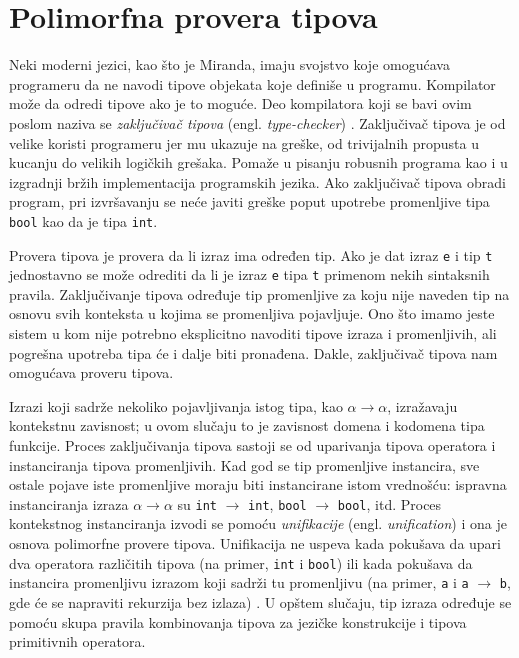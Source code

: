 \section{Polimorfna provera tipova}
\label{sec:provera tipova}

Neki moderni jezici, kao što je Miranda, imaju svojstvo koje omogućava programeru da ne navodi tipove objekata koje definiše u programu. Kompilator može da odredi tipove ako je to moguće. Deo kompilatora koji se bavi ovim poslom naziva se \textit{zaključivač tipova} (engl. \textit{type-checker}) \cite{the-implementation-of-functional-programming-languages}. Zaključivač tipova je od velike koristi programeru jer mu ukazuje na greške, od trivijalnih propusta u kucanju do velikih logičkih grešaka. Pomaže u pisanju robusnih programa kao i u izgradnji bržih implementacija programskih jezika. Ako zaključivač tipova obradi program, pri izvršavanju se neće javiti greške poput upotrebe promenljive tipa \verb|bool| kao da je tipa \verb|int|.



Provera tipova je provera da li izraz ima određen tip. Ako je dat izraz \verb|e| i tip \verb|t| jednostavno se može odrediti da li je izraz \verb|e| tipa \verb|t| primenom nekih sintaksnih pravila. Zaključivanje tipova određuje tip promenljive za koju nije naveden tip na osnovu svih konteksta u kojima se promenljiva pojavljuje. Ono što imamo jeste sistem u kom nije potrebno eksplicitno navoditi tipove izraza i promenljivih, ali pogrešna upotreba tipa će i dalje biti pronađena. Dakle, zaključivač tipova nam omogućava proveru tipova. 


Izrazi koji sadrže nekoliko pojavljivanja istog tipa, kao $\alpha \longrightarrow \alpha$, izra\-ža\-vaju kontekstnu zavisnost; u ovom slučaju to je zavisnost domena i kodomena tipa funkcije. Proces zaključivanja tipova sastoji se od uparivanja tipova operatora i instanciranja tipova promenljivih. Kad god se tip promenljive instancira, sve ostale pojave iste promenljive moraju biti instancirane istom vrednošću: ispravna instanciranja izraza $\alpha \longrightarrow \alpha$ su \verb|int| $\longrightarrow$ \verb|int|,  \verb|bool| $\longrightarrow$ \verb|bool|, itd. Proces kontekstnog instanciranja izvodi se pomoću \textit{unifikacije} (engl. \textit{unification}) i ona je osnova polimorfne provere tipova. Unifikacija ne uspeva kada pokušava da upari dva operatora različitih tipova (na primer, \verb|int| i \verb|bool|) ili kada pokušava da instancira promenljivu izrazom koji sadrži tu promenljivu (na primer, \verb|a| i \verb|a| $\longrightarrow$ \verb|b|, gde će se napraviti rekurzija bez izlaza) \cite{basic-typechecking}. U opštem slučaju, tip izraza određuje se pomoću skupa pravila kombinovanja tipova za jezičke konstrukcije i tipova primitivnih operatora. 

